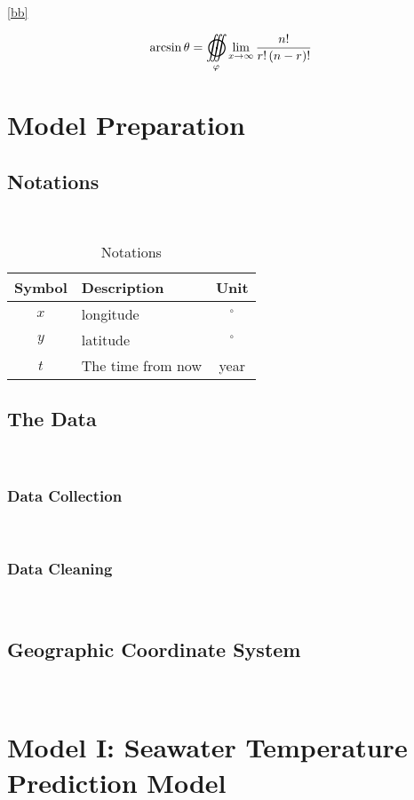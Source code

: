 \documentclass{mcmthesis}
\begin{document}
\lipsum[10] \eqref{bb}

\begin{equation}
	\arcsin \theta  =
	\mathop{{\int\!\!\!\!\!\int\!\!\!\!\!\int}\mkern-31.2mu
		\bigodot}\limits_\varphi
	{\mathop {\lim }\limits_{x \to \infty } \frac{{n!}}{{r!\left( {n - r}
				\right)!}}}
	\label{bb}
\end{equation}


\section{Model Preparation}
\subsection{Notations}
\ 
\indent \lipsum[11]

\begin{table}[htbp]
	\centering
	\caption{Notations}
	\begin{tabular}{clc}
		\toprule
		Symbol & Description & Unit \\
		\midrule
		$x$ & longitude & $^{\circ}$ \\
		$y$ & latitude & $^{\circ}$ \\
		$t$ & The time from now & year \\
		\bottomrule
	\end{tabular}%
	\label{tab:Notations}%
\end{table}%

\subsection{The Data}
\ 
\indent \lipsum[12]
\subsubsection{Data Collection}
\ 
\indent \lipsum[13]
\subsubsection{Data Cleaning}
\ 
\indent \lipsum[14]

\subsection{Geographic Coordinate System}
\ 
\indent \lipsum[15]

\section{Model I: Seawater Temperature Prediction Model}
\ 
\indent \lipsum[16]
\end{document}
